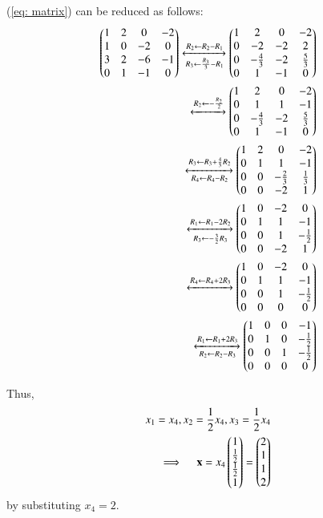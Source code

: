 \documentclass[journal,12pt,twocolumn]{IEEEtran}
\begin{document}
(\ref{eq: matrix}) can be reduced as follows:
\begin{align}
    \begin{pmatrix}1 & 2 & 0 & -2\\
           1 & 0 & -2 & 0\\
           3 & 2 & -6 & -1\\
           0 & 1 & -1 & 0\end{pmatrix}
    \xleftrightarrow[R_{3}\leftarrow \frac{R_3}{3}-R_{1}]{R_{2}\leftarrow R_2- R_1}
    \begin{pmatrix}1 & 2 & 0 & -2\\
           0 & -2 & -2 & 2\\
           0 & -\frac{4}{3} & -2 & \frac{5}{3}\\
           0 & 1 & -1 & 0\end{pmatrix}\\
    \xleftrightarrow{R_2 \leftarrow -\frac{R_2}{2}}
    \begin{pmatrix}1 & 2 & 0 & -2\\
          0 & 1 & 1 & -1\\
          0 & -\frac{4}{3} & -2 & \frac{5}{3}\\
          0 & 1 & -1 & 0\end{pmatrix}\\
    \xleftrightarrow[R_4 \leftarrow R_4- R_2]{R_3 \leftarrow R_3 + \frac{4}{3}R_2}
    \begin{pmatrix}1 & 2 & 0 & -2\\
           0 & 1 & 1 & -1\\
           0 & 0 & -\frac{2}{3} & \frac{1}{3}\\
           0 & 0 & -2 & 1\end{pmatrix}\\
    \xleftrightarrow[R_3 \leftarrow -\frac{3}{2}R_3]{R_1 \leftarrow R_1- 2R_2}
    \begin{pmatrix}1 & 0 & -2 & 0\\
           0 & 1 & 1 & -1\\
           0 & 0 & 1 & -\frac{1}{2}\\
           0 & 0 & -2 & 1\end{pmatrix}\\
    \xleftrightarrow{R_4\leftarrow R_4 + 2R_3}
    \begin{pmatrix}1 & 0 & -2 & 0\\
           0 & 1 & 1 & -1\\
           0 & 0 & 1 & -\frac{1}{2}\\
           0 & 0 & 0 & 0\end{pmatrix}\\
    \xleftrightarrow[R_2\leftarrow R_2-R_3]{R_1\leftarrow R_1 + 2R_3}
    \begin{pmatrix}1 & 0 & 0 & -1\\
           0 & 1 & 0 & -\frac{1}{2}\\
           0 & 0 & 1 & -\frac{1}{2}\\
           0 & 0 & 0 & 0\end{pmatrix}
\end{align}

Thus,
\begin{align}
    x_1=x_4, x_2= \frac{1}{2}x_4, x_3=\frac{1}{2}x_4\\
    \implies \quad\mathbf{x}= x_4\begin{pmatrix}1\\ \frac{1}{2}\\ \frac{1}{2}\\1\end{pmatrix} =\begin{pmatrix}2\\1\\1\\2\end{pmatrix}
\end{align} 
by substituting $x_4= 2$.
\end{document}
